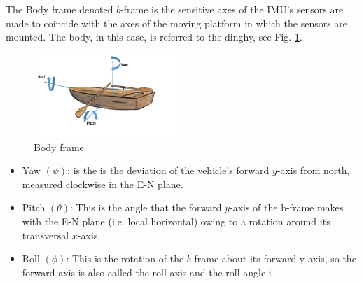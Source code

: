 The Body frame denoted $b$-frame is the sensitive axes of the IMU's sensors are made to coincide with the axes of the moving platform in which the sensors are mounted. The body, in this case, is referred to the dinghy, see Fig. \ref{Fig:body_frame}.

\begin{figure}[H]
\centering
\includegraphics[width=0.5\textwidth]{Figures/Euler_angle.pdf}
\caption{Body frame}
\label{Fig:body_frame}
\end{figure}
\begin{itemize}
\item Yaw $(\psi)$: is the is the deviation of the vehicle’s forward $y$-axis from north, measured clockwise in the E-N plane.
\item Pitch $(\theta)$: This is the angle that the forward $y$-axis of the b-frame makes with the
E-N plane (i.e. local horizontal) owing to a rotation around its transversal $x$-axis.
\item Roll $(\phi)$: This is the rotation of the $b$-frame about its forward y-axis, so the
forward axis is also called the roll axis and the roll angle i
\end{itemize}

